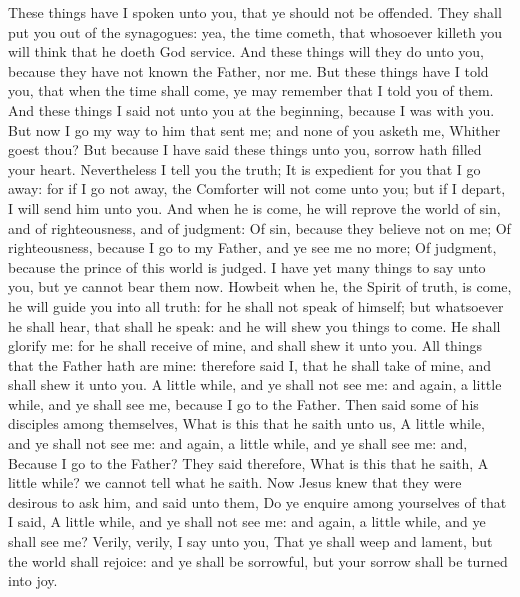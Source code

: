  These things have I spoken unto you, that ye should not
be offended.  They shall put you out of the synagogues:
yea, the time cometh, that whosoever killeth you will think that he
doeth God service.  And these things will they do unto
you, because they have not known the Father, nor me.  But
these things have I told you, that when the time shall come, ye may
remember that I told you of them. And these things I said not unto you
at the beginning, because I was with you.  But now I go my
way to him that sent me; and none of you asketh me, Whither goest thou?
 But because I have said these things unto you, sorrow
hath filled your heart.  Nevertheless I tell you the
truth; It is expedient for you that I go away: for if I go not away, the
Comforter will not come unto you; but if I depart, I will send him unto
you.  And when he is come, he will reprove the world of
sin, and of righteousness, and of judgment:  Of sin,
because they believe not on me;  Of righteousness,
because I go to my Father, and ye see me no more;  Of
judgment, because the prince of this world is judged.  I
have yet many things to say unto you, but ye cannot bear them now.
 Howbeit when he, the Spirit of truth, is come, he will
guide you into all truth: for he shall not speak of himself; but
whatsoever he shall hear, that shall he speak: and he will shew you
things to come.  He shall glorify me: for he shall
receive of mine, and shall shew it unto you.  All things
that the Father hath are mine: therefore said I, that he shall take of
mine, and shall shew it unto you.  A little while, and ye
shall not see me: and again, a little while, and ye shall see me,
because I go to the Father.  Then said some of his
disciples among themselves, What is this that he saith unto us, A little
while, and ye shall not see me: and again, a little while, and ye shall
see me: and, Because I go to the Father?  They said
therefore, What is this that he saith, A little while? we cannot tell
what he saith.  Now Jesus knew that they were desirous to
ask him, and said unto them, Do ye enquire among yourselves of that I
said, A little while, and ye shall not see me: and again, a little
while, and ye shall see me?  Verily, verily, I say unto
you, That ye shall weep and lament, but the world shall rejoice: and ye
shall be sorrowful, but your sorrow shall be turned into joy.
